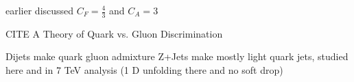 earlier discussed $C_F = \frac{4}{3}$ and $C_A=3$ 

CITE A Theory of Quark vs. Gluon Discrimination

Dijets make quark gluon admixture %
Z+Jets make mostly light quark jets, studied here and in 7 TeV analysis (1 D unfolding there and no soft drop)














